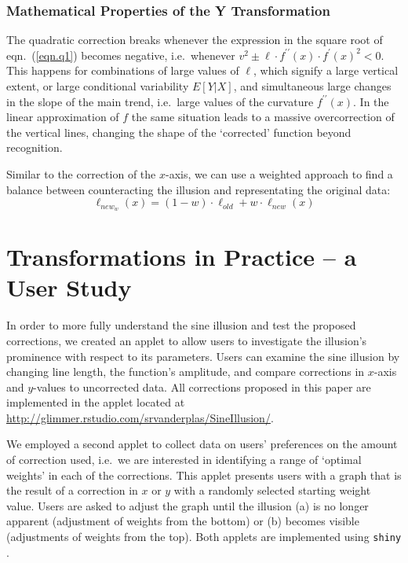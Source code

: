 \documentclass[11pt]{isuthesis}\usepackage[]{graphicx}\usepackage[]{color}
\begin{document}
\subsubsection{Mathematical Properties of the Y Transformation}
The quadratic correction breaks whenever the expression in the square root of eqn.~(\ref{eqn.q1}) becomes negative, i.e.~whenever $v^2 \pm \ell\cdot f^{\prime\prime}(x)\cdot f^\prime(x)^2 < 0$.
This happens for  combinations of large values of $\ell$, which signify a large vertical extent, or large conditional variability $E[Y|X]$, and simultaneous large changes in the slope of the main trend, i.e.~large values of the curvature $f^{\prime\prime}(x)$. In the linear approximation of $f$ the same situation leads to a massive overcorrection of the vertical lines, changing the shape of the `corrected' function beyond recognition.

Similar to the correction of the $x$-axis,  we can use a weighted approach to find a balance between counteracting the illusion and representating the  original data:
\begin{equation}\label{eqn.ytrans.weighted}
\ell_{new_w}(x) = (1-w) \cdot \ell_{old} + w \cdot \ell_{new}(x)
\end{equation}

\section{Transformations in Practice -- a User Study}

In order to more fully understand the sine illusion and test the proposed corrections, we created an applet to allow users to investigate the illusion's prominence with respect to its parameters. Users can examine the sine illusion by changing line length, the function's amplitude, and compare corrections in $x$-axis and $y$-values to uncorrected data.  All corrections proposed in this paper are  implemented in the applet located at \url{http://glimmer.rstudio.com/srvanderplas/SineIllusion/}.

We employed a second applet to collect data on users' preferences on the amount of correction used, i.e.~we are interested in identifying a range of `optimal weights' in each of the corrections. This applet presents users with a graph that is the result of a correction in $x$ or $y$ with a randomly selected starting weight value. Users are asked to adjust the graph until the illusion  (a) is no longer apparent (adjustment of weights from the bottom) or (b) becomes visible (adjustments of weights from the top). Both applets are implemented using {\tt shiny} \citep{shiny}. 
\end{document}
